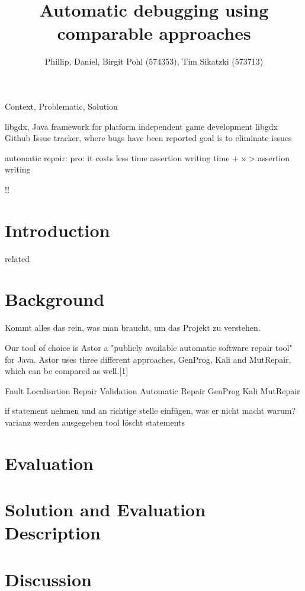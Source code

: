 \documentclass[pdftex,english,oribibl]{llncs}
\title{Automatic debugging using comparable approaches}
\author{Phillip, Daniel, Birgit Pohl (574353), Tim Sikatzki (573713)}
\institute{Humboldt University of Berlin\\Department of Computer Science\\12489 Berlin, Germany}
\makeatletter
\gdef\@keywords{}
\renewenvironment{abstract}{%
  \list{}{\advance\topsep by0.35cm\relax\small%
          \leftmargin=1cm%
          \labelwidth=\z@%
          \listparindent=\z@%
          \itemindent\listparindent%
          \rightmargin\leftmargin}%
          \item[\hskip\labelsep\bfseries\abstractname]}{%
  \if!\@keywords!\else{\item[~]\item[\hskip\labelsep\bfseries\keywordname]\@keywords}\fi%
  \endlist}
\makeatother
\begin{document}
\maketitle

\begin{abstract}
  Context, Problematic, Solution

 libgdx, Java framework for platform independent game development
 libgdx Github Issue tracker, where bugs have been reported
 goal is to eliminate issues
 
 automatic repair: pro: it costs less time
 assertion writing time + x > assertion writing

\end{abstract}

\section{Introduction}
related

\section{Background}\label{sec:background}
Kommt alles das rein, was man braucht, um das Projekt zu verstehen. 

Our tool of choice is Astor a "publicly available automatic software repair tool"  for Java. Astor uses three different approaches, GenProg, Kali and MutRepair, which can be compared as well.[1]

Fault Localisation
Repair Validation
Automatic Repair
GenProg
Kali
MutRepair



if statement nehmen und an richtige stelle einfügen, was er nicht macht
warum? varianz werden ausgegeben
tool löscht statements

\section{Evaluation}\label{sec:evaluation}

\section{Solution and Evaluation Description}\label{sec:solutionEvaluationDescription}

\section{Discussion}\label{sec:discussion}
\end{document}
